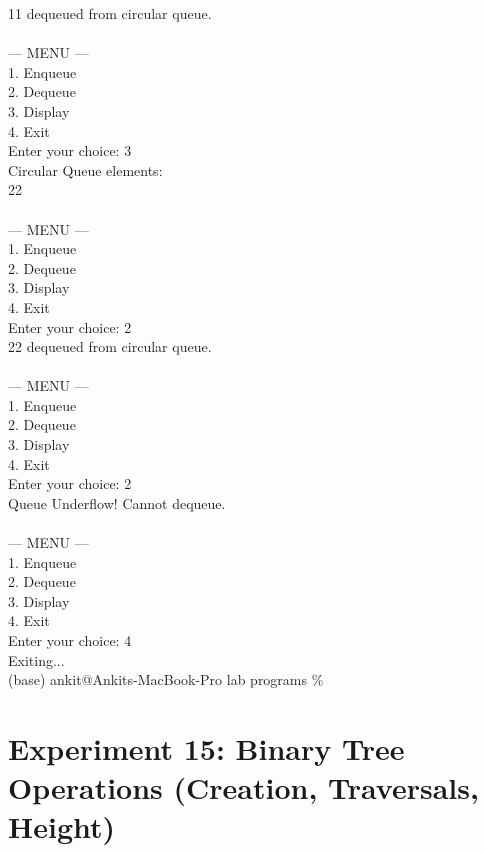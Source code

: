 \documentclass[12pt,a4paper]{article}
\begin{document}
\begin{tcolorbox}[terminalstyle, title=Sample Output]
{11 dequeued from circular queue.\\
\\
--- MENU ---\\
1. Enqueue\\
2. Dequeue\\
3. Display\\
4. Exit\\
Enter your choice: 3\\
Circular Queue elements:\\
22\\
\\
--- MENU ---\\
1. Enqueue\\
2. Dequeue\\
3. Display\\
4. Exit\\
Enter your choice: 2\\
22 dequeued from circular queue.\\
\\
--- MENU ---\\
1. Enqueue\\
2. Dequeue\\
3. Display\\
4. Exit\\
Enter your choice: 2\\
Queue Underflow! Cannot dequeue.\\
\\
--- MENU ---\\
1. Enqueue\\
2. Dequeue\\
3. Display\\
4. Exit\\
Enter your choice: 4\\
Exiting...\\
(base) ankit@Ankits-MacBook-Pro lab programs \%
}
\end{tcolorbox}


\newpage
\section*{Experiment 15: Binary Tree Operations (Creation, Traversals, Height)}
\end{document}
